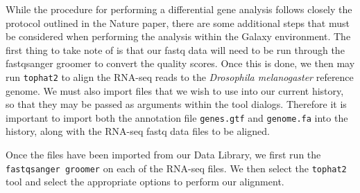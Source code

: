 \documentclass[a4paper,10pt]{article}
\begin{document}
While the procedure for performing a differential gene analysis follows closely the protocol outlined in the Nature paper, there are some additional steps that must be considered when performing the analysis within the Galaxy environment.  The first thing to take note of is that our fastq data will need to be run through the fastqsanger groomer to convert the quality scores.  Once this is done, we then may run \texttt{\footnotesize{tophat2}} to align the RNA-seq reads to the \textit{Drosophila melanogaster} reference genome.  We must also import files that we wish to use into our current history, so that they may be passed as arguments within the tool dialogs.  Therefore it is important to import both the annotation file \texttt{\footnotesize{genes.gtf}} and \texttt{\footnotesize{genome.fa}} into the history, along with the RNA-seq fastq data files to be aligned.

Once the files have been imported from our Data Library, we first run the \texttt{\footnotesize{fastqsanger groomer}} on each of the RNA-seq files.  We then select the \texttt{\footnotesize{tophat2}} tool and select the appropriate options to perform our alignment.
\end{document}
